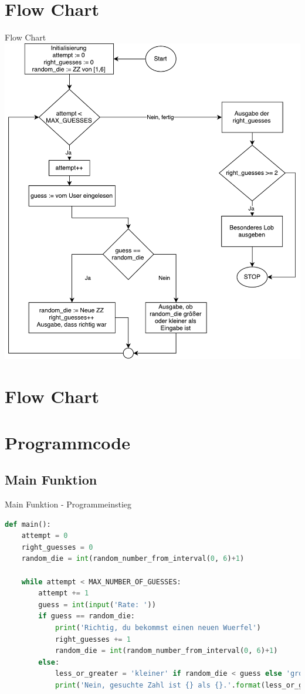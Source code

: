 \section{Flow Chart}
\begin{frame}{Flow Chart}
	\centering
  	\includegraphics[scale=0.3]{BSP05_Flow_Chart_1.pdf}
\end{frame}
\section{Flow Chart}

\section{Programmcode}
\subsection{Main Funktion}
\begin{frame}[fragile]{Main Funktion - Programmeinstieg}
  \begin{lstlisting}[language=python]
def main():
    attempt = 0
    right_guesses = 0
    random_die = int(random_number_from_interval(0, 6)+1)
    
    while attempt < MAX_NUMBER_OF_GUESSES:
        attempt += 1
        guess = int(input('Rate: '))
        if guess == random_die:
            print('Richtig, du bekommst einen neuen Wuerfel')
            right_guesses += 1
            random_die = int(random_number_from_interval(0, 6)+1)
        else:
            less_or_greater = 'kleiner' if random_die < guess else 'groesser'
            print('Nein, gesuchte Zahl ist {} als {}.'.format(less_or_greater, guess))
    
\end{lstlisting}
\logopythonbottom
\end{frame}

